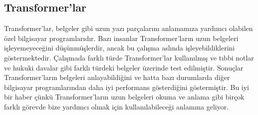 \documentclass{article}
\begin{document}
\subsection{Transformer'lar}
Transformer'lar, belgeler gibi uzun yazı parçalarını anlamamıza yardımcı olabilen özel bilgisayar programlarıdır.
Bazı insanlar Transformer'ların uzun belgeleri işleyemeyeceğini düşünmüşlerdir, ancak bu çalışma aslında işleyebildiklerini göstermektedir.
Çalışmada farklı türde Transformer'lar kullanılmış ve tıbbi notlar ve hukuki davalar gibi farklı türdeki belgeler üzerinde test edilmiştir.
Sonuçlar Transformer'ların belgeleri anlayabildiğini ve hatta bazı durumlarda diğer bilgisayar programlarından daha iyi performans gösterdiğini göstermiştir.
Bu iyi bir haber çünkü Transformer'ların uzun belgeleri okuma ve anlama gibi birçok farklı görevde bize yardımcı olmak için kullanılabileceği anlamına geliyor.
\end{document}
